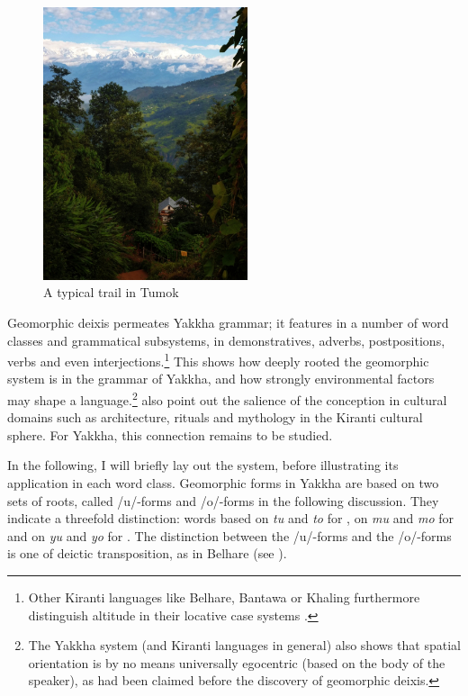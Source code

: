 \begin{figure}
\centering
\includegraphics[width=6cm]{figures/tumok-path.jpg}
\caption{A typical trail in Tumok}\label{tumok-path}
\end{figure}

Geomorphic deixis permeates Yakkha grammar;  it features in a number of word classes and grammatical subsystems, in demonstratives, adverbs, postpositions,  verbs and even interjections.\footnote{Other Kiranti languages like Belhare, Bantawa or Khaling furthermore distinguish altitude in their locative case systems \citep{Ebert1994The-structure, Bickel1997Spatial}.} This shows how deeply rooted the geomorphic system is in the grammar of Yakkha, and how strongly environmental factors may shape a language.\footnote{The Yakkha system (and Kiranti languages in general) also shows that spatial orientation is by no means universally egocentric (based on the body of the speaker), as had been claimed before the discovery of geomorphic deixis.} \citet{Bickeletal1999Cultural} also point out the salience of the  conception in cultural domains such as architecture, rituals and mythology in the Kiranti cultural sphere. For Yakkha, this connection remains to be studied.

In the following, I will briefly lay out the system, before illustrating its application in each word class. Geomorphic forms in Yakkha are based on two sets of roots, called /u/-forms and /o/-forms in the following discussion. They indicate  a threefold distinction: words based on \emph{tu} and \emph{to} for , on \emph{mu} and \emph{mo} for  and on \emph{yu} and \emph{yo} for . The distinction between the /u/-forms and the /o/-forms is one of deictic transposition, as in Belhare (see \citealt{Bickel1997Spatial, Bickel2001Deictic}). 


